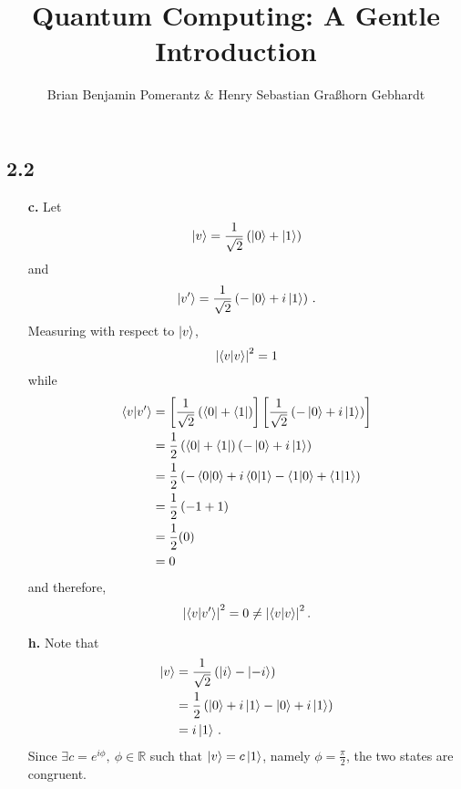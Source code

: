 \documentclass[12pt]{article}
\title{Quantum Computing: A Gentle Introduction}
\author{Brian Benjamin Pomerantz \& Henry Sebastian Graßhorn Gebhardt}
\date{}
\begin{document}
\maketitle

\subsection*{2.2}
\begin{itemize}
\item[\textbf{c.}]
Let
\begin{equation*}
\ket{v} = \frac{1}{\sqrt{2}}\left(\ket{0} + \ket{1}\right)
\end{equation*}
and
\begin{equation*}
\ket{v'} = \frac{1}{\sqrt{2}}\left(-\ket{0} + i\ket{1}\right) \,.
\end{equation*}
Measuring with respect to $\ket{v}$,
\begin{equation*}
\abs{\bra{v}\ket{v}}^2 = 1
\end{equation*}
while
\begin{align*}
\bra{v}\ket{v'} &= \left[\frac{1}{\sqrt{2}}\left(\bra{0} + \bra{1}\right)\right]\left[\frac{1}{\sqrt{2}}\left(-\ket{0} + i\ket{1}\right)\right] \\
&= \frac{1}{2}\left(\bra{0} + \bra{1}\right)\left(-\ket{0} + i\ket{1}\right) \\
&= \frac{1}{2}\left(-\bra{0}\ket{0} + i\bra{0}\ket{1} - \bra{1}\ket{0} + \bra{1}\ket{1}\right) \\
&= \frac{1}{2}\left(-1 + 1\right) \\
&= \frac{1}{2}(0) \\
&= 0
\end{align*}
and therefore,
\begin{equation*}
\abs{\bra{v}\ket{v'}}^2 = 0 \neq \abs{\bra{v}\ket{v}}^2 \,.
\end{equation*}

\item[\textbf{h.}]
Note that
\begin{align*}
\ket{v} &= \frac{1}{\sqrt{2}}\left(\ket{i} - \ket{-i}\right) \\
&= \frac{1}{2}\left(\ket{0} + i\ket{1} - \ket{0} + i\ket{1}\right) \\
&= i\ket{1} \,.
\end{align*}
Since $\exists c = e^{i\phi},\ \phi\in\mathbb{R}$ such that $\ket{v} = c\ket{1}$, namely $\phi = \frac{\pi}{2}$, the two states are congruent.
\end{itemize}
\end{document}

